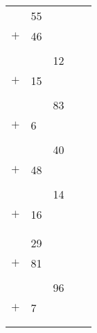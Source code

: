 \documentclass{article}
\begin{document}
\begin{tabularx}{\textwidth}{XXXXX}
	\begin{tabular}{lS}
		&55 \\
		$+$&46 \\
		\hline 
		& \\
	\end{tabular}

	\vspace{0.5in}
	======

	&\begin{tabular}{lS}
		&12 \\
		$+$&15 \\
		\hline 
		& \\
	\end{tabular}

	\vspace{0.5in}
	======

	&\begin{tabular}{lS}
		&83 \\
		$+$&6 \\
		\hline 
		& \\
	\end{tabular}

	\vspace{0.5in}
	======

	&\begin{tabular}{lS}
		&40 \\
		$+$&48 \\
		\hline 
		& \\
	\end{tabular}

	\vspace{0.5in}
	======

	&\begin{tabular}{lS}
		&14 \\
		$+$&16 \\
		\hline 
		& \\
	\end{tabular} 

	\vspace{0.5in}
	====== \\

	\begin{tabular}{lS}
		&29 \\
		$+$&81 \\
		\hline 
		& \\
	\end{tabular}

	&\begin{tabular}{lS}
		&96 \\
		$+$&7 \\
		\hline 
		& \\
	\end{tabular}


\end{tabularx}
\end{document}
